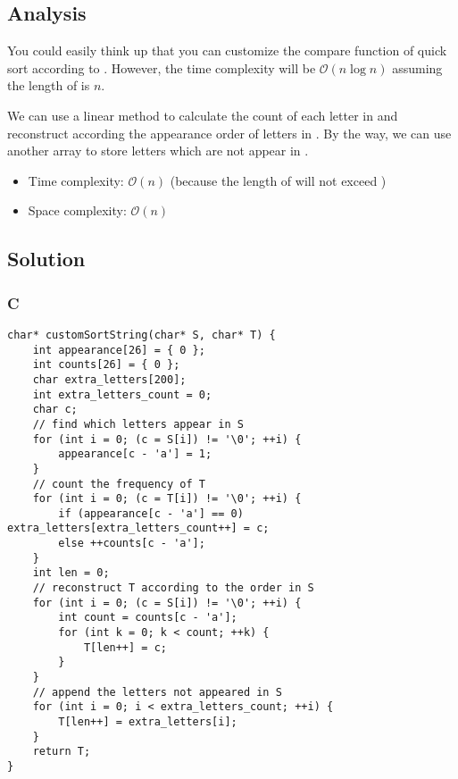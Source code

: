 \subsection*{Analysis}
You could easily think up that you can customize the compare function of quick sort according to . However, the time complexity will be $\mathcal{O}(n\log{n})$ assuming the length of  is $n$.

We can use a linear method to calculate the count of each letter in  and reconstruct  according the appearance order of letters in . By the way, we can use another array to store letters which are not appear in .
\begin{itemize}
    \item Time complexity: $\mathcal{O}(n)$ (because the length of  will not exceed )
    \item Space complexity: $\mathcal{O}(n)$
\end{itemize}

\subsection*{Solution}
\subsubsection{C}
\begin{verbatim}
char* customSortString(char* S, char* T) {
    int appearance[26] = { 0 };
    int counts[26] = { 0 };
    char extra_letters[200];
    int extra_letters_count = 0;
    char c;
    // find which letters appear in S
    for (int i = 0; (c = S[i]) != '\0'; ++i) {
        appearance[c - 'a'] = 1;
    }
    // count the frequency of T
    for (int i = 0; (c = T[i]) != '\0'; ++i) {
        if (appearance[c - 'a'] == 0) extra_letters[extra_letters_count++] = c;
        else ++counts[c - 'a'];
    }
    int len = 0;
    // reconstruct T according to the order in S
    for (int i = 0; (c = S[i]) != '\0'; ++i) {
        int count = counts[c - 'a'];
        for (int k = 0; k < count; ++k) {
            T[len++] = c;
        }
    }
    // append the letters not appeared in S
    for (int i = 0; i < extra_letters_count; ++i) {
        T[len++] = extra_letters[i];
    }
    return T;
}
\end{verbatim}

\newpage

